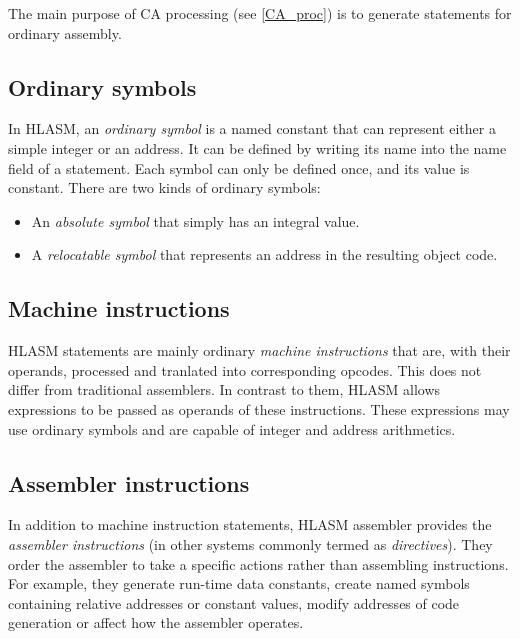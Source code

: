 The main purpose of CA processing (see \cref{CA_proc}) is to generate statements for ordinary assembly.

\subsection{Ordinary symbols}

In HLASM, an \emph{ordinary symbol} is a named constant that can represent either a simple integer or an address. It can be defined by writing its name into the name field of a statement. Each symbol can only be defined once, and its value is constant. There are two kinds of ordinary symbols:
\begin{itemize}
	\item An \emph{absolute symbol} that simply has an integral value.
	\item A \emph{relocatable symbol} that represents an address in the resulting object code.
\end{itemize}

\subsection{Machine instructions}
\label{mach_instr}

HLASM statements are mainly ordinary \emph{machine instructions} that are, with their operands, processed and tranlated into corresponding opcodes. This does not differ from traditional assemblers. In contrast to them, HLASM allows expressions to be passed as operands of these instructions. These expressions may use ordinary symbols and are capable of integer and address arithmetics.

\subsection{Assembler instructions}
\label{asm_instrs}

In addition to machine instruction statements, HLASM assembler provides the \emph{assembler instructions} (in other systems commonly termed as \emph{directives}). They order the assembler to take a specific actions rather than assembling instructions. For example, they generate run-time data constants, create named symbols containing relative addresses or constant values, modify addresses of code generation or affect how the assembler operates.

